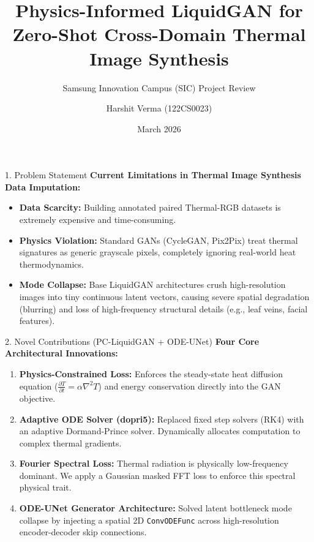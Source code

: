\documentclass[aspectratio=169]{beamer}
\title[PC-LiquidGAN]{Physics-Informed LiquidGAN for Zero-Shot Cross-Domain Thermal Image Synthesis}
\subtitle{Samsung Innovation Campus (SIC) Project Review}
\author[H. Verma]{Harshit Verma (122CS0023)}
\institute[IIITDM Kurnool]{
    Under the Guidance of Dr. N. Srinivas Naik\\
    Dept. of Computer Science and Engineering\\
    IIITDM Kurnool
}
\date{March 2026}
\begin{document}
\begin{frame}
    \titlepage
\end{frame}

\begin{frame}{1. Problem Statement}
    \textbf{Current Limitations in Thermal Image Synthesis Data Imputation:}
    \vspace{0.3cm}
    \begin{itemize}
        \item \textbf{Data Scarcity:} Building annotated paired Thermal-RGB datasets is extremely expensive and time-consuming.
        \item \textbf{Physics Violation:} Standard GANs (CycleGAN, Pix2Pix) treat thermal signatures as generic grayscale pixels, completely ignoring real-world heat thermodynamics.
        \item \textbf{Mode Collapse:} Base LiquidGAN architectures crush high-resolution images into tiny continuous latent vectors, causing severe spatial degradation (blurring) and loss of high-frequency structural details (e.g., leaf veins, facial features).
    \end{itemize}
\end{frame}

\begin{frame}{2. Novel Contributions (PC-LiquidGAN + ODE-UNet)}
    \textbf{Four Core Architectural Innovations:}
    \vspace{0.3cm}
    \begin{enumerate}
        \item \textbf{Physics-Constrained Loss:} Enforces the steady-state heat diffusion equation ($\frac{\partial T}{\partial t} = \alpha \nabla^2 T$) and energy conservation directly into the GAN objective.
        \item \textbf{Adaptive ODE Solver (dopri5):} Replaced fixed step solvers (RK4) with an adaptive Dormand-Prince solver. Dynamically allocates computation to complex thermal gradients.
        \item \textbf{Fourier Spectral Loss:} Thermal radiation is physically low-frequency dominant. We apply a Gaussian masked FFT loss to enforce this spectral physical trait.
        \item \textbf{ODE-UNet Generator Architecture:} Solved latent bottleneck mode collapse by injecting a spatial 2D \texttt{ConvODEFunc} across high-resolution encoder-decoder skip connections.
    \end{enumerate}
\end{frame}
\end{document}

